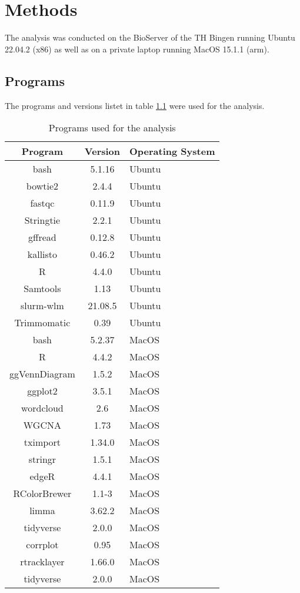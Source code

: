 \chapter{Methods}
The analysis was conducted on the BioServer of the TH Bingen running 
Ubuntu 22.04.2 (x86) as well as on a private laptop running MacOS 15.1.1 (arm). 
\section{Programs}
The programs and versions listet in table \ref{tab:programs} were used for the analysis.

\begin{table}[H]
	\center
	\caption{Programs used for the analysis}\label{tab:programs}
	\begin{tabular}{ccl}
		\toprule

    Program       & Version & Operating System        \\
		\midrule
    bash          & 5.1.16 & Ubuntu       \\
		bowtie2       & 2.4.4   & Ubuntu      \\
		fastqc        & 0.11.9    & Ubuntu    \\
		Stringtie & 2.2.1      & Ubuntu   \\
		gffread       & 0.12.8      & Ubuntu  \\
		kallisto      & 0.46.2       & Ubuntu \\
		R             & 4.4.0        & Ubuntu \\
		Samtools      & 1.13         & Ubuntu \\
		slurm-wlm          & 21.08.5 & Ubuntu \\
		Trimmomatic   & 0.39         & Ubuntu \\
    bash          & 5.2.37    & MacOS    \\
    R & 4.4.2 & MacOS \\
    ggVennDiagram             & 1.5.2  & MacOS       \\
    ggplot2           &   3.5.1   & MacOS   \\
    wordcloud            &   2.6  & MacOS    \\
    WGCNA           &   1.73   & MacOS   \\
    tximport          &     1.34.0 & MacOS   \\
    stringr        &     1.5.1  & MacOS  \\
    edgeR           &   4.4.1    & MacOS  \\
    RColorBrewer         &  1.1-3   & MacOS    \\
    limma         &  3.62.2    & MacOS   \\
    tidyverse         &  2.0.0    & MacOS   \\
    corrplot         &  0.95    & MacOS   \\
    rtracklayer         &  1.66.0 & MacOS \\
    tidyverse         &  2.0.0   & MacOS    \\
		\bottomrule
	\end{tabular}
\end{table}

